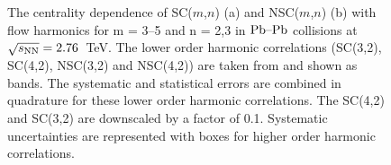 \begin{figure}[t!]
            \begin{center}
                       \hspace{-0.67cm}
        \caption{The centrality dependence of SC($m$,$n$) (a) and NSC($m$,$n$) (b) with flow harmonics for m = 3--5 and n = 2,3 in $\textnormal{Pb--Pb}$ collisions at $\sqrt{s_{\textnormal{NN}}}=2.76$~TeV. The lower order harmonic correlations (SC(3,2), SC(4,2), NSC(3,2) and NSC(4,2)) are taken from \cite{ALICE:2016kpq} and shown as bands. The systematic and statistical errors are combined in quadrature for these lower order harmonic correlations. The SC(4,2) and SC(3,2) are downscaled by a factor of 0.1. Systematic uncertainties are represented with boxes for higher order harmonic correlations.}
        \label{fig:Figure_1}
              \end{center}
\end{figure}


